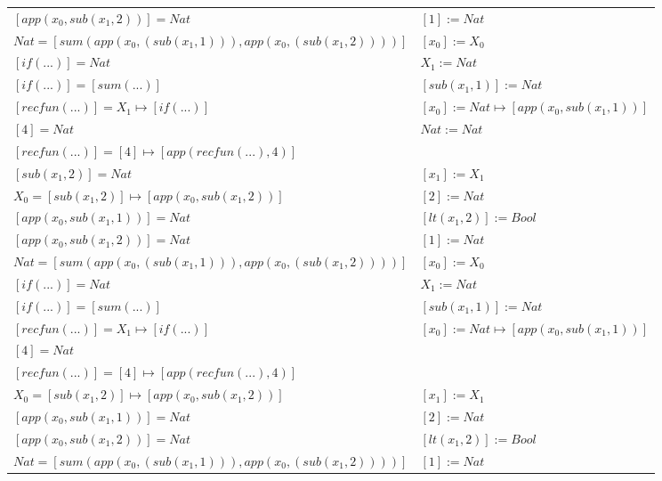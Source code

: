 \begin{exercise}
\begin{description}
\begin{center}
\begin{longtable}{ | l | l | }
                        $[app(x_0, sub(x_1,2))] = Nat$ & $[1] := Nat$ \\
                        $Nat = [sum(app(x_0, (sub(x_1,1))), app(x_0, (sub(x_1,2))))]$ & $[x_0] := X_0$ \\
                        $[if(...)] = Nat$ & $X_1 := Nat$ \\
                        $[if(...)] = [sum(...)]$ & $[sub(x_1,1)] := Nat$ \\
                        $[recfun(...)] = X_1 \mapsto [if(...)]$ & $[x_0] := Nat \mapsto [app(x_0, sub(x_1,1))]$  \\
                        $[4] = Nat$ &   $Nat := Nat$ \\
                        $[recfun(...)] = [4] \mapsto [app(recfun(...), 4)]$ & \\
                    \hline
                        $[sub(x_1,2)] = Nat$ & $[x_1] := X_1$ \\
                        $X_0 =  [sub(x_1,2)] \mapsto [app(x_0, sub(x_1,2))]$ &  $[2] := Nat$ \\
                        $[app(x_0, sub(x_1,1))] = Nat$ & $[lt(x_1 , 2)] := Bool$ \\
                        $[app(x_0, sub(x_1,2))] = Nat$ & $[1] := Nat$ \\
                        $Nat = [sum(app(x_0, (sub(x_1,1))), app(x_0, (sub(x_1,2))))]$ & $[x_0] := X_0$ \\
                        $[if(...)] = Nat$ & $X_1 := Nat$ \\
                        $[if(...)] = [sum(...)]$ &  $[sub(x_1,1)] := Nat$ \\
                        $[recfun(...)] = X_1 \mapsto [if(...)]$ &  $[x_0] := Nat \mapsto [app(x_0, sub(x_1,1))]$ \\
                        $[4] = Nat$ & \\
                        $[recfun(...)] = [4] \mapsto [app(recfun(...), 4)]$ & \\
                    \hline
                        $X_0 = [sub(x_1,2)] \mapsto [app(x_0, sub(x_1,2))]$ & $[x_1] := X_1$ \\
                        $[app(x_0, sub(x_1,1))] = Nat$ & $[2] := Nat$ \\
                        $[app(x_0, sub(x_1,2))] = Nat$ & $[lt(x_1 , 2)] := Bool$ \\
                        $Nat = [sum(app(x_0, (sub(x_1,1))), app(x_0, (sub(x_1,2))))]$ & $[1] := Nat$ \\

\end{longtable}
\end{center}
\end{description}
\end{exercise}
